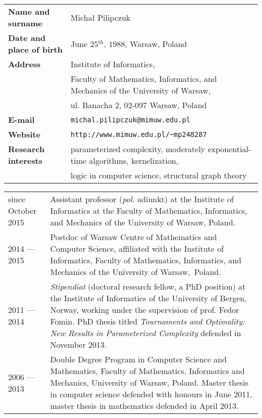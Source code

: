 

\begin{small}
\noindent
\begin{tabular}{@{\hspace{0cm}}l @{\hspace{10mm}} p{13cm}}
{\bf Name and surname} & Michał Pilipczuk\\[0.1cm]
{\bf Date and place of birth} & June 25$^{\textrm{th}}$, $1988$, Warsaw, Poland\\[0.1cm]
{\bf Address} & Institute of Informatics,\\
& Faculty of Mathematics, Informatics, and Mechanics of the University of Warsaw,\\
& ul. Banacha 2, 02-097 Warsaw, Poland\\[0.1cm]
{\bf E-mail} & \verb+michal.pilipczuk@mimuw.edu.pl+\\[0.1cm]
{\bf Website} & \verb+http://www.mimuw.edu.pl/~mp248287+\\[0.1cm]
{\bf Research interests} & parameterized complexity, moderately exponential-time algorithms, kernelization,\\ &
logic in computer science, structural graph theory
\end{tabular}
\end{small}

\begin{small}
\noindent
\begin{tabular}{@{}p{3cm} @{\hspace{2mm}} p{13.2cm}}
since October 2015 & Assistant professor ({\em{pol.}} adiunkt) at the Institute of Informatics at the Faculty of Mathematics, Informatics, and Mechanics of the University of Warsaw, Poland. \\[0.2cm]
2014 --- 2015 & Postdoc of Warsaw Centre of Mathematics and Computer Science, affiliated with the Institute of Informatics, Faculty of Mathematics, Informatics, and Mechanics of the University of Warsaw,~Poland. \\[0.2cm]
2011 --- 2014 & {\em{Stipendiat}} (doctoral research fellow, a PhD position) at the Institute of Informatics of the University of Bergen, Norway, working under the supervision of prof. Fedor Fomin.
PhD thesis titled \emph{Tournaments and Optimality: New Results in Parameterized Complexity} defended in November 2013.\\[0.2cm]
2006 --- 2013 & Double Degree Program in Computer Science and Mathematics, Faculty of Mathematics, Informatics and Mechanics, University of Warsaw, Poland. 
Master thesis in computer science defended with honours in June 2011, master thesis in mathematics defended in April 2013.
\end{tabular}
\end{small}

